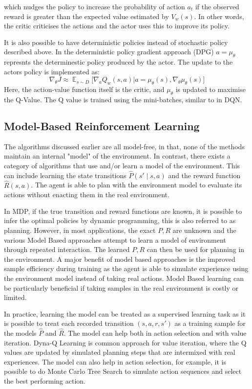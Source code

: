 \documentclass[12pt,a4paper]{report}
\DeclareMathOperator{\EX}{\mathbb{E}}
\begin{document}
which nudges the policy to increase the probability of action $a_t$ if the observed reward is greater than the expected value estimated by $V_w(s)$. In other words, the critic criticises the actions and the actor uses this to improve its policy. \par

It is also possible to have deterministic policies instead of stochastic policy described above. In the deterministic policy gradient approach (DPG) $a = \mu_\theta$ represnts the determinestic policy produced by the actor. The update to the actors policy is implemented as:
\[
  \nabla_\theta J \approx \EX_{s \sim D}\big[\nabla_a Q_w(s,a)\big|{a=\mu_\theta(s)} ,\nabla_\theta \mu_\theta(s)\big]
\]
Here, the action-value function itself is the critic, and $\mu_\theta$ is updated to maximise the Q-Value. The Q value is trained using the mini-batches, similar to in DQN.  

\subsection{Model-Based Reinforcement Learning}
The algorithms discussed earlier are all model-free, in that, none of the methods maintain an internal "model" of the environment. In contrast, there exists a category of algorithms that use and/or learn a model of the environment. This can include learning the state transitions $\hat{P}(s' \mid s, a)$ and the reward function $\hat{R}(s, a)$. The agent is able to plan with the environment model to evaluate its actions without enacting them in the real environment. \par

In MDP, if the true transition and reward functions are known, it is possible to infer the optimal policies by dynamic programming, this is also referred to as planning. However, in most applications, the exact $P, R$ are unknown and the various Model Based approaches attempt to learn a model of environment through repeated interaction. The learned $P, R$ can then be used for planning in the environment. A major benefit of model based approaches is the improved sample efficiency during training as the agent is able to simulate experience using the environment model instead of taking real actions. Model Based learning can be particularly beneficial if taking samples in the real environment is costly or limited. \par 

In practice, learning the model can be treated as a supervised learning task as it is possible to treat each recorded transition $(s, a, r, s')$ as a training sample for the models $\hat{P}$ and $\hat{R}$. The model can help both in action selection and with value iteration. Dyna-Q Learning is common approach for value iteration, where the Q values are updated by simulated planning steps that are intermixed with real experiences. The model can also help in action selection, for example, it is possible to do Monte Carlo Tree Search to simulate action sequences and select the best performing action.\par
\end{document}
